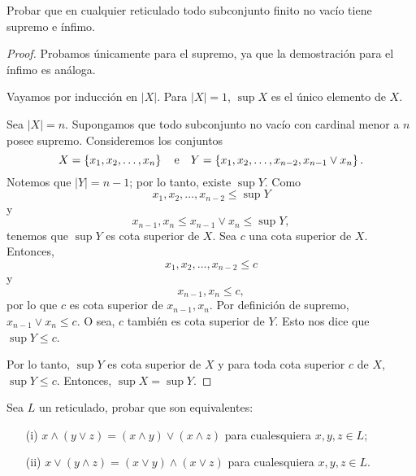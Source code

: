 \begin{exercise}[4]
    Probar que en cualquier reticulado todo subconjunto finito no vacío tiene supremo e ínfimo.
\end{exercise}

\begin{proof}
    Probamos únicamente para el supremo, ya que la demostración para el ínfimo es análoga. 
    
    Vayamos por inducción en $\left| X \right|$. Para $\left| X \right| = 1$, $\sup X$ es el único elemento de $X$.

    Sea $\left| X \right| = n$. Supongamos que todo subconjunto no vacío con cardinal menor a $n$ posee supremo. Consideremos los conjuntos
    $$
        X = \left\{  x_{1}, x_{2}, \dots, x_{n}  \right\} \quad \text{e} \quad Y = \left\{  x_{1}, x_{2}, \dots, x_{n-2}, x_{n-1} \vee x_{n}  \right\}.
    $$
    Notemos que $\left| Y \right| = n-1$; por lo tanto, existe $\sup Y$. Como 
    $$
        x_1, x_2, \dots, x_{n-2} \leq \sup Y
    $$
    y
    $$
        x_{n-1}, x_n \leq x_{n-1} \vee x_{n} \leq \sup Y,
    $$
    tenemos que $\sup Y$ es cota superior de $X$. Sea $c$ una cota superior de $X$. Entonces,
    $$
    x_1, x_2, \dots, x_{n-2} \leq c
    $$
    y
    $$
        x_{n-1}, x_n \leq c,
    $$
    por lo que $c$ es cota superior de $x_{n-1}, x_n$. Por definición de supremo, $x_{n-1} \vee x_{n} \leq c$. O sea, $c$ también es cota superior de $Y$. Esto nos dice que $\sup Y \leq c$. 

    Por lo tanto, $\sup Y$ es cota superior de $X$ y para toda cota superior $c$ de $X$, $\sup Y \leq c$. Entonces, $\sup X = \sup Y$.
\end{proof}

\begin{exercise}[5]
    Sea $L$ un reticulado, probar que son equivalentes:
    \begin{enumerate}
        \item[(i)] $x \wedge (y \vee z) = (x \wedge y) \vee (x \wedge z)$ para cualesquiera $x, y, z \in L$;
        \item[(ii)] $x \vee (y \wedge z) = (x \vee y) \wedge (x \vee z)$ para cualesquiera $x, y, z \in L$.
    \end{enumerate}
\end{exercise}

